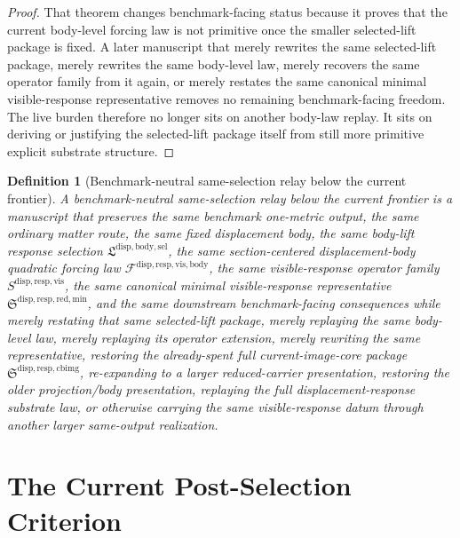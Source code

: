 \documentclass[11pt]{article}
\newcommand{\LiftSelectionPackage}{\mathfrak L^{\mathrm{disp,body,sel}}}
\newcommand{\VisibleBodyForcingLaw}{\mathscr F^{\mathrm{disp,resp,vis,body}}}
\newcommand{\VisibleResponseOperator}{S^{\mathrm{disp,resp,vis}}}
\newcommand{\MinimalReducedStructure}{\mathfrak S^{\mathrm{disp,resp,red,min}}}
\newcommand{\CurrentBodyImageCore}{\mathfrak S^{\mathrm{disp,resp,cbimg}}}
\newtheorem{definition}{Definition}
\begin{document}
\begin{proof}
That theorem changes benchmark-facing status because it proves that the current body-level forcing law is not primitive once the smaller selected-lift package is fixed. A later manuscript that merely rewrites the same selected-lift package, merely rewrites the same body-level law, merely recovers the same operator family from it again, or merely restates the same canonical minimal visible-response representative removes no remaining benchmark-facing freedom. The live burden therefore no longer sits on another body-law replay. It sits on deriving or justifying the selected-lift package itself from still more primitive explicit substrate structure.
\end{proof}

\begin{definition}[Benchmark-neutral same-selection relay below the current frontier]
A \emph{benchmark-neutral same-selection relay below the current frontier} is a manuscript that preserves the same benchmark one-metric output, the same ordinary matter route, the same fixed displacement body, the same body-lift response selection \(\LiftSelectionPackage\), the same section-centered displacement-body quadratic forcing law \(\VisibleBodyForcingLaw\), the same visible-response operator family \(\VisibleResponseOperator\), the same canonical minimal visible-response representative \(\MinimalReducedStructure\), and the same downstream benchmark-facing consequences while merely restating that same selected-lift package, merely replaying the same body-level law, merely replaying its operator extension, merely rewriting the same representative, restoring the already-spent full current-image-core package \(\CurrentBodyImageCore\), re-expanding to a larger reduced-carrier presentation, restoring the older projection/body presentation, replaying the full displacement-response substrate law, or otherwise carrying the same visible-response datum through another larger same-output realization.
\end{definition}

\section{The Current Post-Selection Criterion}
\end{document}
